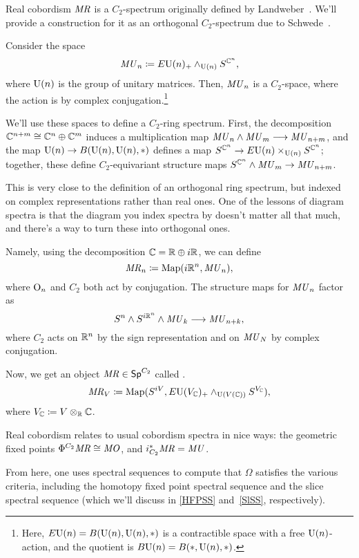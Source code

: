 \begin{defn}
\label{MRdefn}
Real cobordism $\mathit{MR}$ is a $C_2$-spectrum originally defined by Landweber~\cite{LandweberMR}. We'll provide a
construction for it as an orthogonal $C_2$-spectrum due to Schwede~\cite{SchwedeEquivariant}.

Consider the space
\[\mathit{MU}_n\coloneqq E\mathrm U(n)_+\wedge_{\mathrm U(n)} S^{\mathbb C^n},\]
where $\mathrm U(n)$ is the group of unitary matrices. Then, $\mathit{MU}_n$ is a $C_2$-space, where the action is by complex
conjugation.\footnote{Here, $E\mathrm U(n) = B(\mathrm U(n), \mathrm U(n), *)$ is a contractible space with a free $\mathrm U(n)$-action, and
the quotient is $B\mathrm U(n) = B(*, \mathrm U(n), *)$.}

We'll use these spaces to define a $C_2$-ring spectrum. First, the decomposition $\mathbb C^{n+m}\cong\mathbb C^n\oplus\mathbb C^m$
induces a multiplication map $\mathit{MU}_n\wedge\mathit{MU}_m\longrightarrow \mathit{MU}_{n+m}$, and the map $\mathrm U(n)\to B(\mathrm U(n), \mathrm U(n), *)$
defines a map $S^{\mathbb C^n}\to E\mathrm U(n)\times_{\mathrm U(n)} S^{\mathbb C^n}$; together, these define $C_2$-equivariant structure maps
$S^{\mathbb C^n}\wedge\mathit{MU}_m\to \mathit{MU}_{n+m}$.

This is very close to the definition of an orthogonal ring spectrum, but indexed on complex representations rather
than real ones. One of the lessons of diagram spectra is that the diagram you index spectra by doesn't matter all
that much, and there's a way to turn these  into orthogonal ones.

Namely, using the decomposition $\mathbb C = \mathbb R\oplus i\mathbb R$, we can define
\[\mathit{MR}_n\coloneqq \operatorname{Map}(i\mathbb R^n, \mathit{MU}_n),\]
where $\mathrm O_n$ and $C_2$ both act by conjugation. The structure maps for $\mathit{MU}_n$ factor as
\[S^n\wedge S^{i\mathbb R^n}\wedge\mathit{MU}_k\longrightarrow \mathit{MU}_{n+k},\]
where $C_2$ acts on $\mathbb R^n$ by the sign representation and on $\mathit{MU}_N$ by complex conjugation.

Now, we get an object $\mathit{MR}\in\mathsf{Sp}^{C_2}$ called .
\[\mathit{MR}_V \coloneqq \operatorname{Map}(S^{iV}, E\mathrm U(V_\mathbb C)_+\wedge_{\mathrm U(V(\mathbb C))}S^{V_\mathbb C}),\]
where $V_\mathbb C\coloneqq V\otimes_\mathbb R\mathbb C$.
\end{defn}
Real cobordism relates to usual cobordism spectra in nice ways: the geometric fixed points
$\Phi^{C_2}\mathit{MR}\cong\mathit{MO}$, and $i_{C_2}^*\mathit{MR} = \mathit{MU}$.

From here, one uses spectral sequences to compute that $\Omega$ satisfies the various criteria, including the
homotopy fixed point spectral sequence and the slice spectral sequence (which we'll discuss in \cref{HFPSS}
and~\eqref{SlSS}, respectively).

